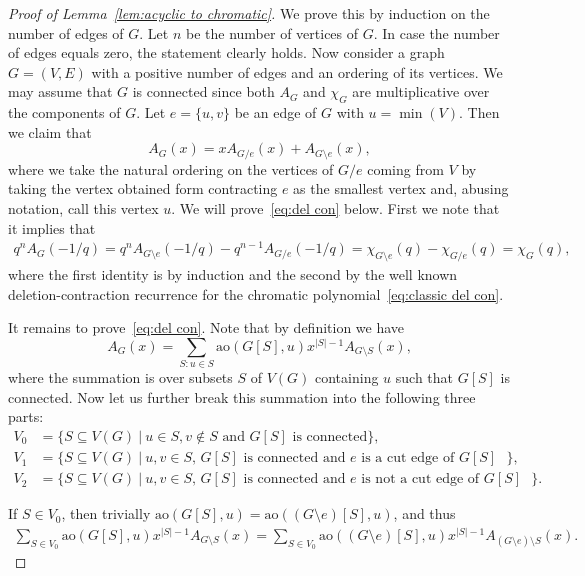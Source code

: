 \documentclass[a4paper,11pt,reqno]{amsart}
\numberwithin{equation}{section}
\begin{document}
\begin{proof}[Proof of Lemma~\ref{lem:acyclic to chromatic}]
We prove this by induction on the number of edges of $G$. Let $n$ be the number of vertices of $G$.
In case the number of edges equals zero, the statement clearly holds.
Now consider a graph $G=(V,E)$ with a positive number of edges and an ordering of its vertices.
We may assume that $G$ is connected since both $A_G$ and $\chi_G$ are multiplicative over the components of $G$.
Let $e=\{u,v\}$ be an edge of $G$ with $u=\min(V)$.
Then we claim that 
\begin{equation}
A_{G}(x)=xA_{G/e}(x)+A_{G\setminus e}(x), \label{eq:del con}
\end{equation}
where we take the natural ordering on the vertices of $G/e$ coming from $V$ by taking the vertex obtained form contracting $e$ as the smallest vertex and, abusing notation, call this vertex $u$. We will prove~\eqref{eq:del con} below. 
First we note that it implies that
\begin{align*}
q^nA_G(-1/q)=q^nA_{G\setminus e}(-1/q)-q^{n-1}A_{G/e}(-1/q)=\chi_{G\setminus e}(q)-\chi_{G/e}(q)=\chi_G(q),
\end{align*}
where the first identity is by induction and the second by the well known deletion-contraction recurrence for the chromatic polynomial~\eqref{eq:classic del con}.

It remains to prove~\eqref{eq:del con}. Note that by definition we have
\[
    A_G(x)=\sum_{S: u\in S} \text{ao}(G[S],u) x^{|S|-1} A_{G\setminus S}(x),
\]
where the summation is over subsets $S$ of $V(G)$ containing $u$ such that $G[S]$ is connected. Now let us further break this summation into the following three parts:
\begin{align*}
V_0&=\{S\subseteq V(G)~|~u\in S, v\notin S \textrm{ and $G[S]$ is connected}\}, \\
V_1&=\{S\subseteq V(G)~|~u,v\in S \textrm{, $G[S]$ is connected and $e$ is a cut edge of $G[S]$ }\}, \\
V_2&=\{S\subseteq V(G)~|~u,v\in S \textrm{, $G[S]$ is connected and $e$ is not a cut edge of $G[S]$ }\}.
\end{align*}

If $S\in V_0$, then trivially $\text{ao}(G[S],u)=\text{ao}((G\setminus e)[S],u)$, and thus
\begin{align}\label{eq:ao_0}
    \sum_{S\in V_0} \text{ao}(G[S],u) x^{|S|-1} A_{G\setminus S}(x)=\sum_{S\in V_0} \text{ao}((G\setminus e)[S],u) x^{|S|-1} A_{(G\setminus e)\setminus S}(x).
\end{align}


\end{proof}
\end{document}
